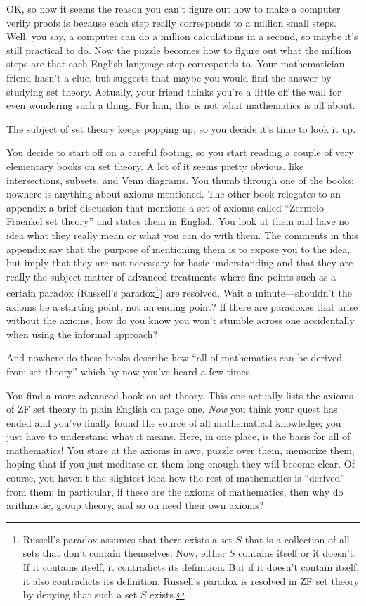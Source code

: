 OK, so now it seems the reason you can't figure out how to make a
computer verify proofs is because each step really corresponds to a
million small steps.  Well, you say, a computer can do a million
calculations in a second, so maybe it's still practical to do.  Now the
puzzle becomes how to figure out what the million steps are that each
English-language step corresponds to.  Your mathematician friend hasn't
a clue, but suggests that maybe you would find the answer by studying
set theory.  Actually, your friend thinks you're a little off the wall
for even wondering such a thing.  For him, this is not what mathematics
is all about.

The subject of set theory keeps popping up, so you decide it's
time to look it up.

You decide to start off on a careful footing, so you start reading a couple of
very elementary books on set theory.  A lot of it seems pretty obvious, like
intersections, subsets, and Venn diagrams.  You thumb through one of the
books; nowhere is anything about axioms mentioned. The other book relegates to
an appendix a brief discussion that mentions a set of axioms called
``Zermelo-Fraenkel set theory'' and states
them in English.  You look at them and have no idea what they really mean or
what you can do with them.  The comments in this appendix say that the purpose
of mentioning them is to expose you to the idea, but imply that they are not
necessary for basic understanding and that they are really the subject matter
of advanced treatments where fine points such as a certain paradox (Russell's
paradox\footnote{Russell's paradox assumes that there
exists a set $S$ that is a collection of all sets that don't contain
themselves.  Now, either $S$ contains itself or it doesn't.  If it contains
itself, it contradicts its definition.  But if it doesn't contain itself, it
also contradicts its definition.  Russell's paradox is resolved in ZF set
theory by denying that such a set $S$ exists.}) are resolved.  Wait a
minute---shouldn't the axioms be a starting point, not an ending point?  If
there are paradoxes that arise without the axioms, how do you know you won't
stumble across one accidentally when using the informal approach?

And nowhere do these books describe how ``all of mathematics can be
derived from set theory'' which by now you've heard a few times.

You find a more advanced book on set theory.  This one actually lists the
axioms of ZF set theory in plain English on page one.  {\em Now} you think
your quest has ended and you've finally found the source of all mathematical
knowledge; you just have to understand what it means.  Here, in one place, is
the basis for all of mathematics!  You stare at the axioms in awe, puzzle over
them, memorize them, hoping that if you just meditate on them long enough they
will become clear.  Of course, you haven't the slightest idea how the rest of
mathematics is ``derived'' from them; in particular, if these are the axioms
of mathematics, then why do arithmetic, group theory, and so on need their own
axioms?

